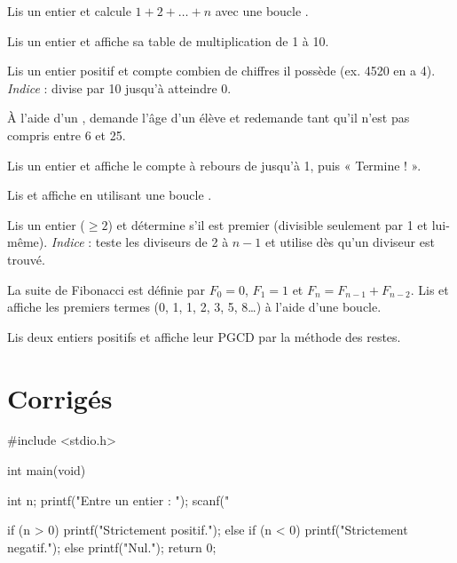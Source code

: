 Lis un entier  et calcule $1 + 2 + \dots + n$ avec une boucle .

Lis un entier  et affiche sa table de multiplication de 1 à 10.


Lis un entier positif et compte combien de chiffres il possède (ex. 4520 en a 4).
\emph{Indice} : divise par 10 jusqu'à atteindre 0.

À l'aide d'un , demande l'âge d'un élève et redemande tant qu'il
n'est pas compris entre 6 et 25.

Lis un entier  et affiche le compte à rebours de  jusqu'à 1, puis
« Termine ! ».

Lis  et affiche  en utilisant une boucle .

Lis un entier  ($\geq 2$) et détermine s'il est premier (divisible seulement
par 1 et lui-même). \emph{Indice} : teste les diviseurs de 2 à $n-1$ et utilise
 dès qu'un diviseur est trouvé.

La suite de Fibonacci est définie par $F_0 = 0$, $F_1 = 1$ et
$F_n = F_{n-1} + F_{n-2}$. Lis  et affiche les  premiers termes
(0, 1, 1, 2, 3, 5, 8\dots) à l'aide d'une boucle.

Lis deux entiers positifs et affiche leur PGCD par la méthode des restes.

\section{Corrigés}

\begin{codec}
#include <stdio.h>

int main(void) {
    int n;
    printf("Entre un entier : ");
    scanf("%

    if (n > 0) {
        printf("Strictement positif.\n");
    } else if (n < 0) {
        printf("Strictement negatif.\n");
    } else {
        printf("Nul.\n");
    }
    return 0;
}
\end{codec}


